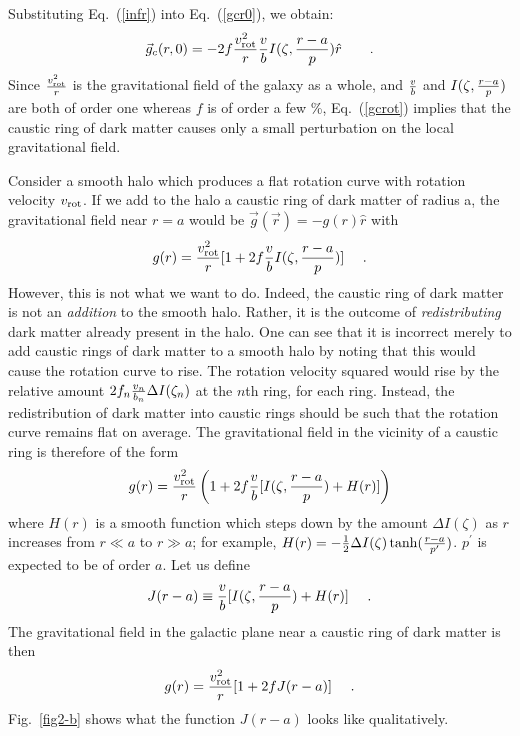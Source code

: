 \documentclass[aps,prd,preprint,tightenlines,floatfix,showpacs,groupedaddress]{revtex4}
\begin{document}
Substituting Eq.~(\ref{infr}) into Eq.~(\ref{gcr0}), we obtain:
\begin{equation}
\vec{g}_c(r,0) = - 2 f {v_{\rm rot}^2 \over r} {v \over b}
I(\zeta, {r-a \over p}) \hat{r}~~~~~\ .
\label{gcrot}
\end{equation}
Since ${v_{\rm rot}^2 \over r}$ is the gravitational field of the 
galaxy as a whole, and ${v \over b}$ and $I(\zeta, {r-a \over p})$ are
both of order one whereas $f$ is of order a few \%, Eq.~(\ref{gcrot}) 
implies that the caustic ring of dark matter causes only a small 
perturbation on the local gravitational field.

Consider a smooth halo which produces a flat rotation curve with 
rotation velocity $v_{\rm rot}$. If we add to the halo a caustic
ring of dark matter of radius a, the gravitational field near 
$r=a$ would be $\vec{g}(\vec{r}) = - g(r) \hat{r}$ with 
\begin{equation}
g(r) = {v_{\rm rot}^2 \over r} [1 + 2 f {v \over b} 
I(\zeta, {r-a \over p})]~~~\ .
\label{incg}
\end{equation}
However, this is not what we want to do.  Indeed, the caustic ring 
of dark matter is not an {\it addition} to the smooth halo.  Rather, 
it is the outcome of {\it redistributing} dark matter already 
present in the halo.  One can see that it is incorrect merely 
to add caustic rings of dark matter to a smooth halo by noting 
that this would cause the rotation curve to rise.  The rotation 
velocity squared would rise by the relative amount 
$2 f_n {v_n \over b_n} \Delta I(\zeta_n)$ at the $n$th ring, 
for each ring.  Instead, the redistribution of dark matter 
into caustic rings should be such that the rotation curve 
remains flat on average.  The gravitational field in the 
vicinity of a caustic ring is therefore
of the form
\begin{equation}
g(r) = {v_{\rm rot}^2 \over r}\left(1 + 2 f {v \over b}
[I(\zeta, {r-a \over p}) + H(r)]\right)
\label{corrgr}
\end{equation}
where $H(r)$ is a smooth function which steps down by the amount
$\Delta I (\zeta)$ as $r$ increases from $r \ll a$ to $r \gg a$;
for example, 
$H(r) = - {1 \over 2} \Delta I(\zeta) 
\tanh ({r-a \over p^\prime})$. $p^\prime$ is expected to be of 
order $a$.  Let us define
\begin{equation}
J(r - a) \equiv {v \over b} [I(\zeta, {r-a \over p}) + H(r)]~~~\ .
\label{Jr}
\end{equation}
The gravitational field in the galactic plane near a caustic 
ring of dark matter is then
\begin{equation}
g(r) = {v_{\rm rot}^2 \over r} [1 + 2 f J(r-a)]~~~\ .
\label{fingr}
\end{equation}
Fig.~\ref{fig2-b} shows what the function $J(r-a)$ looks 
like qualitatively.
\end{document}
